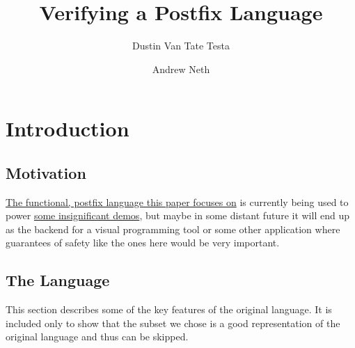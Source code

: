 \documentclass[acmsmall, review]{acmart}
\theoremstyle{definition}
\begin{document}
\title{Verifying a Postfix Language}


\author{Dustin Van Tate Testa}

\author{Andrew Neth}


\maketitle


\section{Introduction}
\subsection{Motivation}
\href{https://github.com/dvtate/postfix-haskell}{The functional, postfix language this paper focuses on} is currently being used to power \href{https://ridder.xyz/game}{some insignificant demos}, but maybe in some distant future it will end up as the backend for a visual programming tool or some other application where guarantees of safety like the ones here would be very important.

\subsection{The Language}
This section describes some of the key features of the original language. It is included only to show that the subset we chose is a good representation of the original language and thus can be skipped.
\end{document}
